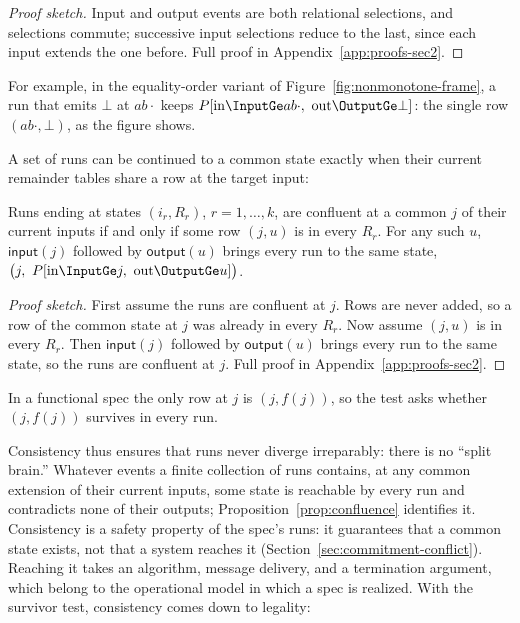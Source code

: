 \begin{proof}[Proof sketch]
Input and output events are both relational selections, and selections
commute; successive input selections reduce to the last, since each input
extends the one before.  Full proof in Appendix~\ref{app:proofs-sec2}.
\end{proof}

For example, in the equality-order variant of
Figure~\ref{fig:nonmonotone-frame}, a run that emits $\bot$ at $ab\cdot$ keeps
$P[\mathrm{in}\InputGe ab\cdot,\ \mathrm{out}\OutputGe\bot]$: the single row
$(ab\cdot,\bot)$, as the figure shows.

A set of runs can be continued to a common state exactly when their
current remainder tables share a row at the target input:

\begin{proposition}
\label{prop:confluence}
Runs ending at states $(i_r,R_r)$, $r=1,\ldots,k$, are confluent at a common
\indesc $j$ of their current inputs if and only if some row $(j,u)$ is in every
$R_r$.  For any such $u$, $\mathsf{input}(j)$ followed by $\mathsf{output}(u)$
brings every run to the same state,
$\bigl(j,\ P[\mathrm{in}\InputGe j,\ \mathrm{out}\OutputGe u]\bigr)$.
\end{proposition}

\begin{proof}[Proof sketch]
First assume the runs are confluent at $j$.  Rows are never added, so a row of
the common state at $j$ was already in every $R_r$.  Now assume $(j,u)$ is in
every $R_r$.  Then $\mathsf{input}(j)$ followed by $\mathsf{output}(u)$ brings
every run to the same state, so the runs are confluent at $j$.  Full proof in
Appendix~\ref{app:proofs-sec2}.
\end{proof}

In a functional spec the only row at $j$ is $(j,f(j))$, so the test
asks whether $(j,f(j))$ survives in every run.

Consistency thus ensures that runs never diverge irreparably: there is no
``split brain.''  Whatever events a finite collection of runs contains, at any common extension of their current inputs, some state is reachable by every run
and contradicts none of their outputs; Proposition~\ref{prop:confluence}
identifies it.  Consistency is a safety property of the spec's runs: it guarantees that a common
state exists, not that a system reaches it
(Section~\ref{sec:commitment-conflict}).  Reaching it takes an algorithm,
message delivery, and a termination argument, which belong to the operational
model in which a spec is realized.  With the survivor test, consistency comes down to legality:

